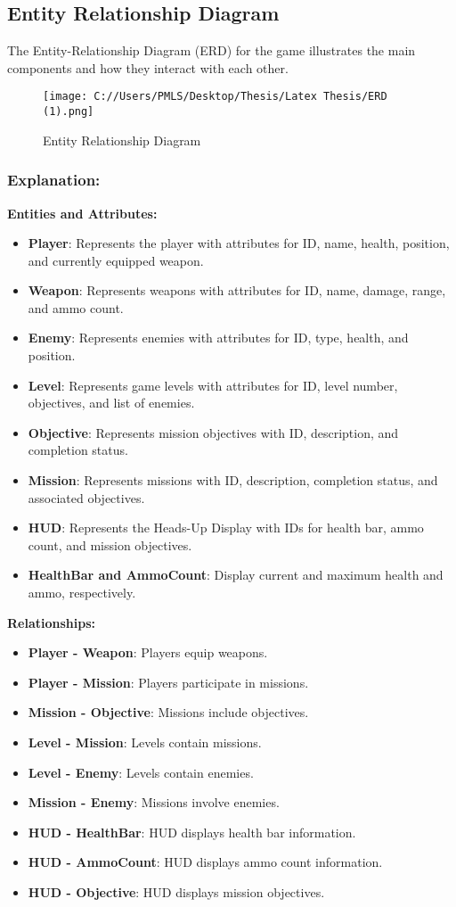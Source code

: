 \subsection{Entity Relationship Diagram}
The Entity-Relationship Diagram (ERD) for the game illustrates the main components and how they interact with each other.
\begin{figure}[H]
	\centering
	\texttt{[image: C://Users/PMLS/Desktop/Thesis/Latex Thesis/ERD (1).png]}
	\caption{Entity Relationship Diagram}
	\label{fig:ERD}
\end{figure}
\subsubsection{Explanation:}

\textbf{Entities and Attributes:}

\begin{itemize}
	\item \textbf{Player}: Represents the player with attributes for ID, name, health, position, and currently equipped weapon.
	\item \textbf{Weapon}: Represents weapons with attributes for ID, name, damage, range, and ammo count.
	\item \textbf{Enemy}: Represents enemies with attributes for ID, type, health, and position.
	\item \textbf{Level}: Represents game levels with attributes for ID, level number, objectives, and list of enemies.
	\item \textbf{Objective}: Represents mission objectives with ID, description, and completion status.
	\item \textbf{Mission}: Represents missions with ID, description, completion status, and associated objectives.
	\item \textbf{HUD}: Represents the Heads-Up Display with IDs for health bar, ammo count, and mission objectives.
	\item \textbf{HealthBar and AmmoCount}: Display current and maximum health and ammo, respectively.
\end{itemize}

\textbf{Relationships:}

\begin{itemize}
	\item \textbf{Player - Weapon}: Players equip weapons.
	\item \textbf{Player - Mission}: Players participate in missions.
	\item \textbf{Mission - Objective}: Missions include objectives.
	\item \textbf{Level - Mission}: Levels contain missions.
	\item \textbf{Level - Enemy}: Levels contain enemies.
	\item \textbf{Mission - Enemy}: Missions involve enemies.
	\item \textbf{HUD - HealthBar}: HUD displays health bar information.
	\item \textbf{HUD - AmmoCount}: HUD displays ammo count information.
	\item \textbf{HUD - Objective}: HUD displays mission objectives.
\end{itemize}

